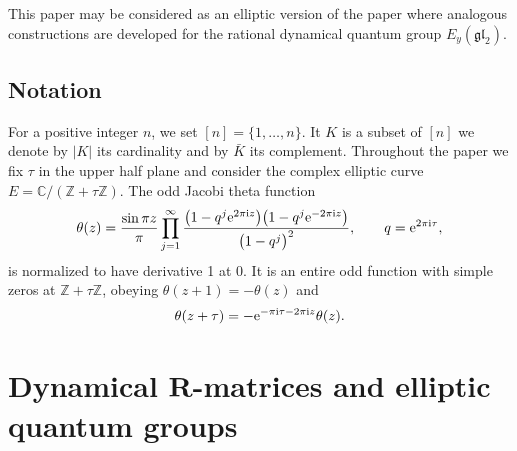 \documentclass[pdftex]{sigma}
\numberwithin{equation}{section}
\begin{document}
This paper may be considered as an elliptic version of the paper \cite{RV2} where analogous constructions are developed for the rational dynamical quantum group $E_y(\mathfrak{gl}_2)$.

\subsection*{Notation} For a positive integer $n$, we set $[n]=\{1,\dots,n\}$. It $K$ is a subset of $[n]$ we denote by $|K|$ its cardinality and by $\bar K$ its complement. Throughout the paper we fix $\tau$ in the upper half plane and consider the complex elliptic curve $E=\mathbb C/(\mathbb Z+\tau \mathbb Z)$. The odd Jacobi theta function
\begin{gather}\label{e-theta}
 \theta(z)=\frac{\sin \pi z}{\pi}\prod_{j=1}^\infty\frac{\big(1-q^j{\rm e}^{2\pi{\rm i}z}\big)\big(1-q^j{\rm e}^{-2\pi{\rm i}z}\big)}{\big(1-q^j\big)^2},\qquad q={\rm e}^{2\pi{\rm i}\tau},
\end{gather}
is normalized to have derivative 1 at $0$. It is an entire odd function with simple zeros at $\mathbb Z+\tau\mathbb Z$, obeying $\theta(z+1)=-\theta(z)$ and
\begin{gather*}
 \theta(z+\tau)=-{\rm e}^{-\pi {\rm i}\tau-2\pi{\rm i}z}\theta(z).
\end{gather*}

\section[Dynamical $R$-matrices and elliptic quantum groups]{Dynamical $\boldsymbol{R}$-matrices and elliptic quantum groups}\label{s-2}
\end{document}
